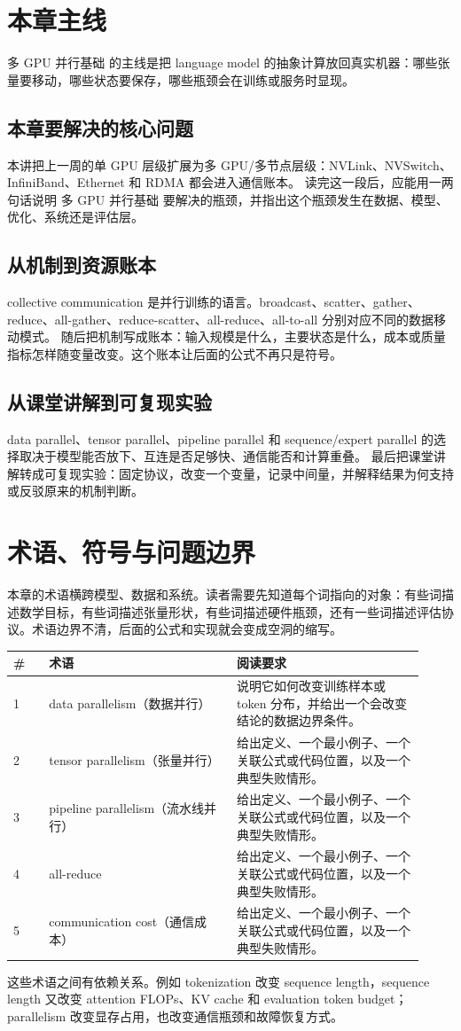 \documentclass[a4paper]{article}
\begin{document}
\section{本章主线}
多 GPU 并行基础 的主线是把 language model 的抽象计算放回真实机器：哪些张量要移动，哪些状态要保存，哪些瓶颈会在训练或服务时显现。
\subsection{本章要解决的核心问题}
本讲把上一周的单 GPU 层级扩展为多 GPU/多节点层级：NVLink、NVSwitch、InfiniBand、Ethernet 和 RDMA 都会进入通信账本。
读完这一段后，应能用一两句话说明 多 GPU 并行基础 要解决的瓶颈，并指出这个瓶颈发生在数据、模型、优化、系统还是评估层。
\subsection{从机制到资源账本}
collective communication 是并行训练的语言。broadcast、scatter、gather、reduce、all-gather、reduce-scatter、all-reduce、all-to-all 分别对应不同的数据移动模式。
随后把机制写成账本：输入规模是什么，主要状态是什么，成本或质量指标怎样随变量改变。这个账本让后面的公式不再只是符号。
\subsection{从课堂讲解到可复现实验}
data parallel、tensor parallel、pipeline parallel 和 sequence/expert parallel 的选择取决于模型能否放下、互连是否足够快、通信能否和计算重叠。
最后把课堂讲解转成可复现实验：固定协议，改变一个变量，记录中间量，并解释结果为何支持或反驳原来的机制判断。
\section{术语、符号与问题边界}
本章的术语横跨模型、数据和系统。读者需要先知道每个词指向的对象：有些词描述数学目标，有些词描述张量形状，有些词描述硬件瓶颈，还有一些词描述评估协议。术语边界不清，后面的公式和实现就会变成空洞的缩写。
\begin{longtable}{p{0.08\linewidth}p{0.42\linewidth}p{0.42\linewidth}}
\toprule
\textbf{\#} & \textbf{术语} & \textbf{阅读要求}\\
\midrule
1 & data parallelism（数据并行） & 说明它如何改变训练样本或 token 分布，并给出一个会改变结论的数据边界条件。\\
2 & tensor parallelism（张量并行） & 给出定义、一个最小例子、一个关联公式或代码位置，以及一个典型失败情形。\\
3 & pipeline parallelism（流水线并行） & 给出定义、一个最小例子、一个关联公式或代码位置，以及一个典型失败情形。\\
4 & all-reduce & 给出定义、一个最小例子、一个关联公式或代码位置，以及一个典型失败情形。\\
5 & communication cost（通信成本） & 给出定义、一个最小例子、一个关联公式或代码位置，以及一个典型失败情形。\\
\bottomrule
\end{longtable}
这些术语之间有依赖关系。例如 tokenization 改变 sequence length，sequence length 又改变 attention FLOPs、KV cache 和 evaluation token budget；parallelism 改变显存占用，也改变通信瓶颈和故障恢复方式。
\end{document}
